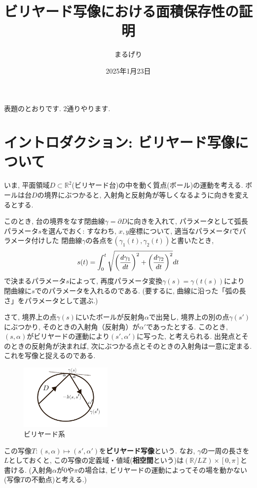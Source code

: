 \documentclass[a4paper]{ujarticle}
\title{ビリヤード写像における面積保存性の証明}
\numberwithin{equation}{section}
\theoremstyle{definition}
\begin{document}
\date{2025年1月23日}
\author{まるげり}

\maketitle
\setcounter{section}{-1}
表題のとおりです.
2通りやります.
\section{イントロダクション: ビリヤード写像について}

    いま, 平面領域$D \subset \mathbb{R}^2$(ビリヤード台)の中を動く質点(ボール)の運動を考える. 
    ボールは台$D$の境界にぶつかると, 入射角と反射角が等しくなるように向きを変えるとする.

    このとき, 台の境界をなす閉曲線$\gamma = \partial D$に向きを入れて, 
    パラメータとして弧長パラメータ$s$を選んでおく:
    すなわち, $x, y$座標について, 適当なパラメータ$t$でパラメータ付けした
    閉曲線$\gamma$の各点を$(\gamma_1(t), \gamma_2(t))$と書いたとき, 
    \[
        s(t) = \int_{0}^{t} \sqrt{\qty(\frac{d \gamma_1}{d t})^2 + \qty(\frac{d \gamma_2}{d t})^2} d t
    \]
    で決まるパラメータ$s$によって, 再度パラメータ変換$\gamma(s) = \gamma(t(s))$により
    閉曲線に$s$でのパラメータを入れるのである.
    (要するに, 曲線に沿った「弧の長さ」をパラメータとして選ぶ.)

    さて, 境界上の点$\gamma(s)$にいたボールが反射角$\alpha$で出発し,
    境界上の別の点$\gamma(s')$にぶつかり, そのときの入射角（反射角）が$\alpha'$であったとする.
    このとき, $(s, \alpha)$がビリヤードの運動により$(s', \alpha')$に写った, と考えられる.
    出発点とそのときの反射角が決まれば, 次にぶつかる点とそのときの入射角は一意に定まる.
    これを写像と捉えるのである.

    \begin{figure}[h]
        \centering
        \includegraphics[width = 0.4\textwidth]{billiard2.png}
        \caption{ビリヤード系}
    \end{figure}

    この写像$T: (s, \alpha) \mapsto (s', \alpha')$を\textbf{ビリヤード写像}という.
    なお, $\gamma$の一周の長さを$L$としておくと, 
    この写像の定義域・値域(\textbf{相空間}という)は$(\mathbb{R}/L \mathbb{Z}) \times [0, \pi]$と書ける.
    (入射角$\alpha$が$0$や$\pi$の場合は, ビリヤードの運動によってその場を動かない(写像$T$の不動点)と考える.)
\end{document}
